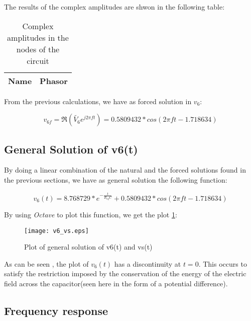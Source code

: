 \hfill


The results of the complex amplitudes are shwon in the following table:

\begin{table}[b]
  \centering
  \begin{tabular}{|l|c|}
    \hline
    {\bf Name} & {\bf Phasor} \\ \hline
    
  \end{tabular}
  \caption{Complex amplitudes in the nodes of the circuit}
  \label{tab:op_tabNodal}
\end{table}


From the previous calculations, we have as forced solution in $v_6$:

\begin{equation}
  v_{6f} = \Re (\tilde{V_6} e^{j 2\pi f t}) = 0.5809432*cos(2 \pi f t - 1.718634)
  \label{forcedSolution}
\end{equation}


\subsection{General Solution of v6(t)}

By doing a linear combination of the natural and the forced solutions found in the previous sections, we have as general solution the following function:

\begin{equation}
  v_6(t) = 8.768729*e^{-\frac{t}{R_{eq}C}} + 0.5809432*cos(2 \pi f t - 1.718634)
  \label{finalSolution}
\end{equation}

By using \textit{Octave} to plot this function, we get the plot \ref{fig:generalFinal}:

\begin{figure}[h] \centering
  \texttt{[image: v6\_vs.eps]}
  \caption{Plot of general solution of v6(t) and vs(t) }
  \label{fig:generalFinal}
\end{figure}


As can be seen , the plot of $v_6(t)$ has a discontinuity at $t = 0$.
This occurs to satisfy the restriction imposed by the conservation of the energy  of the electric field across the capacitor(seen here in the form of a potential difference).


\subsection{Frequency response}

